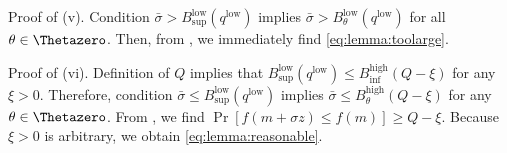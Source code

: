 \documentclass[journal]{IEEEtran}
\providecommand{\E}{\mathbb{E}} %
\providecommand{\ind}[1]{\ensuremath{\mathbbm{1}_{\left\{#1\right\}}}} %
\renewcommand{\geq}{\geqslant} %
\renewcommand{\leq}{\leqslant} %
\DeclarePairedDelimiter{\norm}{\lVert}{\rVert}
\theoremstyle{definition}
\newcommand{\markupdraft}[2]{%
\ifthenelse{\equal{#1}{display}}{#2}{}%
\ifthenelse{\equal{#1}{color}}{\color{#2}}{}%
}
\newcommand{\todo}[2][]{\markupdraft{display}{{\color{red}\noindent++TODO: #2 {\color{yellow}(#1)}++}}}
\begin{document}
Proof of (v). 
Condition $\bar\sigma > B_{\sup}^\mathrm{low}(q^\mathrm{low})$ implies
$\bar\sigma > B_\theta^\mathrm{low}(q^\mathrm{low})$ for all $\theta\in\Thetazero$.
Then, from , we immediately find \eqref{eq:lemma:toolarge}.

Proof of (vi). 
Definition of $Q$ implies that $B_{\sup}^\mathrm{low}(q^\mathrm{low}) \leq B_{\inf}^\mathrm{high}(Q - \xi)$ for any $\xi > 0$. 
Therefore, condition $\bar\sigma \leq B_{\sup}^\mathrm{low}(q^\mathrm{low}) $ implies $\bar\sigma \leq B_{\theta}^\mathrm{high}(Q - \xi)$ for any $\theta\in\Thetazero$.
From , we find $\Pr\left[f(m + \sigma z) \leq f(m) \right] \geq Q - \xi$. Because $\xi > 0$ is arbitrary, we obtain \eqref{eq:lemma:reasonable}. 




\end{document}
